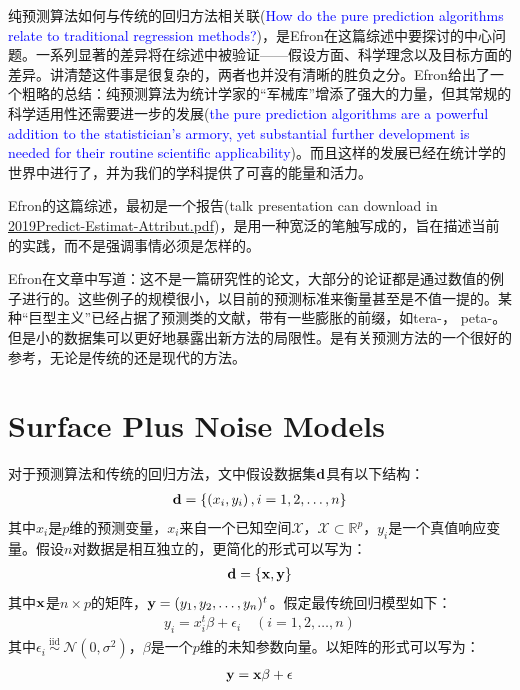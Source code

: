 \documentclass[lang=cn,11pt,a4paper,cite=authoryear]{elegantpaper}
\begin{document}
纯预测算法如何与传统的回归方法相关联(\textcolor{blue}{How do the pure prediction algorithms relate to traditional regression methods?})，是Efron在这篇综述中要探讨的中心问题。一系列显著的差异将在综述中被验证——假设方面、科学理念以及目标方面的差异。讲清楚这件事是很复杂的，两者也并没有清晰的胜负之分。Efron给出了一个粗略的总结：纯预测算法为统计学家的“军械库”增添了强大的力量，但其常规的科学适用性还需要进一步的发展(\textcolor{blue}{the pure prediction algorithms are a powerful addition to the statistician's armory, yet substantial further development is needed for their routine scientific applicability})。而且这样的发展已经在统计学的世界中进行了，并为我们的学科提供了可喜的能量和活力。

Efron的这篇综述，最初是一个报告(talk presentation can download in \href{http://statweb.stanford.edu/~ckirby/brad/talks/2019Predict-Estimat-Attribut.pdf}{2019Predict-Estimat-Attribut.pdf})，是用一种宽泛的笔触写成的，旨在描述当前的实践，而不是强调事情必须是怎样的。

Efron在文章中写道：这不是一篇研究性的论文，大部分的论证都是通过数值的例子进行的。这些例子的规模很小，以目前的预测标准来衡量甚至是不值一提的。某种“巨型主义”已经占据了预测类的文献，带有一些膨胀的前缀，如tera-， peta-。但是小的数据集可以更好地暴露出新方法的局限性。\cite{hastie2009elements}是有关预测方法的一个很好的参考，无论是传统的还是现代的方法。

\section{Surface Plus Noise Models}

对于预测算法和传统的回归方法，文中假设数据集$\bold{d}$具有以下结构：
\begin{align}
\label{data}
	\bold{d}=\left\{\left(x_{i}, y_{i}\right), i=1,2, \ldots, n\right\}
\end{align}
其中$x_i$是$p$维的预测变量，$x_i$来自一个已知空间$\mathcal{X}$，$\mathcal{X} \subset \mathbb{R}^p$，$y_i$是一个真值响应变量。假设$n$对数据是相互独立的，更简化的形式可以写为：
\begin{align}
	\bold{d}=\{\bold{x}, \bold{y}\}
\end{align}
其中$\bold{x}$是$n \times p$的矩阵，$\bold{y} = (y_1, y_2, \ldots , y_n)^t$。假定最传统回归模型如下：
\begin{align}
\label{regression model}
y_{i}=x_{i}^{t} \beta+\epsilon_{i} \quad(i=1,2, \ldots, n)
\end{align}
其中$\epsilon_{i} \stackrel{\text { iid }}{\sim} \mathcal{N}\left(0, \sigma^{2}\right)$，$\beta$是一个$p$维的未知参数向量。以矩阵的形式可以写为：
\begin{align}
\bold{y}=\bold{x} \beta+\epsilon
\end{align}
\end{document}
